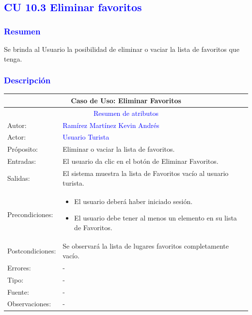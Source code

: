 \pagebreak
\subsection{\textcolor{blue}{CU 10.3 Eliminar favoritos}}

\subsubsection{\textcolor{blue}{Resumen}}
Se brinda al Usuario la posibilidad de eliminar o vaciar la lista de favoritos que tenga.
\subsubsection{\textcolor{blue}{Descripción}}
\begin{tabularx}{16cm}{||l|X||}
	\hline
	\multicolumn{2}{||c||}{Caso de Uso: Eliminar Favoritos} \\
	\hline
	\multicolumn{2}{||c||}{\textcolor{blue}{Resumen de atributos}} \\
 \hline
	{Autor:} & {\textcolor{blue}{Ramírez Martínez Kevin Andrés}} \\
	\hline
	\hline
	{Actor:} & {\textcolor{blue}{Usuario Turista}} \\
	\hline
	{Próposito:} & Eliminar o vaciar la lista de favoritos.\\
	\hline
	{Entradas:} & El usuario da clic en el botón de Eliminar Favoritos.
        \\
	\hline
	{Salidas:} & El sistema muestra la lista de Favoritos vacío al usuario turista.\\
	\hline
	{Precondiciones:} & 
        \begin{itemize}
            \item El usuario deberá haber iniciado sesión.
            \item El usuario debe tener al menos un elemento en su lista de Favoritos.
        \end{itemize}\\ 
	\hline
	{Postcondiciones:} & Se observará la lista de lugares favoritos completamente vacío.\\
	\hline
	{Errores:} & {-} \\
	\hline
	{Tipo:} & {-}\\
	\hline
	{Fuente:} & {-} \\
	\hline
	{Observaciones:} & {-} \\
	\hline
\end{tabularx}

